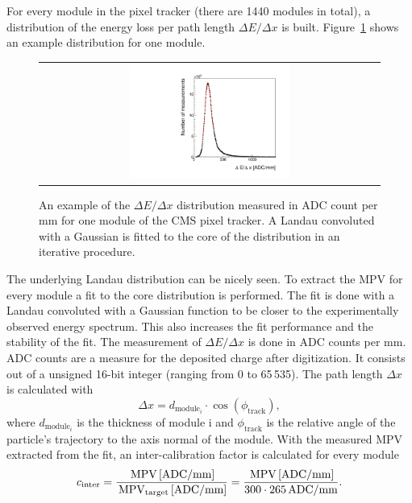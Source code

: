 For every module in the pixel tracker (there are 1440 modules in total), a distribution of the energy loss per path length $\Delta E/\Delta x$ is built.
Figure~\ref{fig:dEdx_Module} shows an example distribution for one module.
\begin{figure}[!bt]
  \centering 
  \begin{tabular}{c}
  \includegraphics[width=0.49\textwidth]{figures/analysis/Landau_Module_352476680.pdf}
  \end{tabular}
  \caption{An example of the $\Delta E/\Delta x$ distribution measured in ADC count per mm for one module of the CMS pixel tracker. 
           A Landau convoluted with a Gaussian is fitted to the core of the distribution in an iterative procedure.} 
  \label{fig:dEdx_Module}
\end{figure}
The underlying Landau distribution can be nicely seen. 
To extract the MPV for every module a fit to the core distribution is performed.
The fit is done with a Landau convoluted with a Gaussian function to be closer to the experimentally observed energy spectrum.
This also increases the fit performance and the stability of the fit.
The measurement of $\Delta E/\Delta x$ is done in ADC counts per mm.
ADC counts are a measure for the deposited charge after digitization.
It consists out of a unsigned 16-bit integer (ranging from 0 to 65\,535).
The path length $\Delta x$ is calculated with
\begin{equation*}
\Delta x = d_{\text{module}_i} \cdot \cos(\phi_{\text{track}}),
\end{equation*}
where $d_{\text{module}_i}$ is the thickness of module i and $\phi_{\text{track}}$ is the relative angle of the particle's trajectory to the axis normal of the module.
With the measured MPV extracted from the fit, an inter-calibration factor is calculated for every module
\begin{equation*}
c_{\text{inter}}=\frac{\,\text{MPV}\, [\text{ADC/mm}]}{\,\text{MPV}_{\text{target}}\, [\text{ADC/mm}]} = \frac{\,\text{MPV}\, [\text{ADC/mm}]}{300 \cdot 265 \, \text{ADC/mm}}.
\end{equation*}

